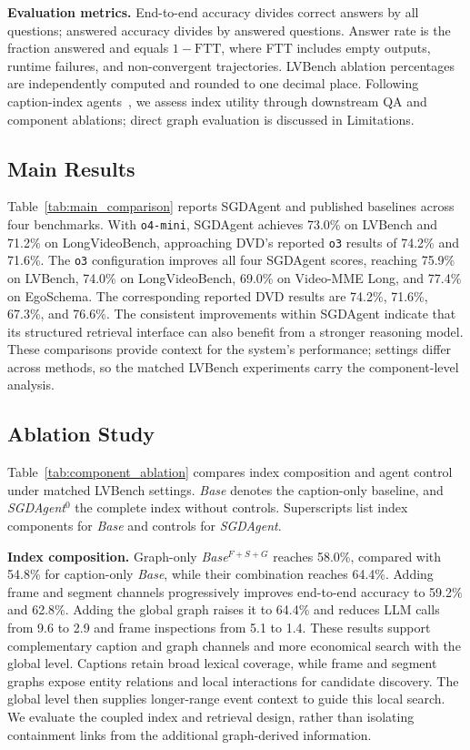 \documentclass[11pt]{article}
\begin{document}
\textbf{Evaluation metrics.}
End-to-end accuracy divides correct answers by all questions; answered accuracy divides by answered questions.
Answer rate is the fraction answered and equals $1-\mathrm{FTT}$, where FTT includes empty outputs, runtime failures, and non-convergent trajectories.
LVBench ablation percentages are independently computed and rounded to one decimal place.
Following caption-index agents~\cite{videoagent,deepvideo2025,drvideo2025}, we assess index utility through downstream QA and component ablations; direct graph evaluation is discussed in Limitations.

\subsection{Main Results}
\label{sec:results}

Table~\ref{tab:main_comparison} reports SGDAgent and published baselines across four benchmarks.
With \texttt{o4-mini}, SGDAgent achieves 73.0\% on LVBench and 71.2\% on LongVideoBench, approaching DVD's reported \texttt{o3} results of 74.2\% and 71.6\%.
The \texttt{o3} configuration improves all four SGDAgent scores, reaching 75.9\% on LVBench, 74.0\% on LongVideoBench, 69.0\% on Video-MME Long, and 77.4\% on EgoSchema.
The corresponding reported DVD results are 74.2\%, 71.6\%, 67.3\%, and 76.6\%.
The consistent improvements within SGDAgent indicate that its structured retrieval interface can also benefit from a stronger reasoning model.
These comparisons provide context for the system's performance; settings differ across methods, so the matched LVBench experiments carry the component-level analysis.

\subsection{Ablation Study}

Table~\ref{tab:component_ablation} compares index composition and agent control under matched LVBench settings.
\emph{Base} denotes the caption-only baseline, and \emph{SGDAgent}$^0$ the complete index without controls.
Superscripts list index components for \emph{Base} and controls for \emph{SGDAgent}.

\textbf{Index composition.}
Graph-only \emph{Base}$^{F+S+G}$ reaches 58.0\%, compared with 54.8\% for caption-only \emph{Base}, while their combination reaches 64.4\%.
Adding frame and segment channels progressively improves end-to-end accuracy to 59.2\% and 62.8\%.
Adding the global graph raises it to 64.4\% and reduces LLM calls from 9.6 to 2.9 and frame inspections from 5.1 to 1.4.
These results support complementary caption and graph channels and more economical search with the global level.
Captions retain broad lexical coverage, while frame and segment graphs expose entity relations and local interactions for candidate discovery.
The global level then supplies longer-range event context to guide this local search.
We evaluate the coupled index and retrieval design, rather than isolating containment links from the additional graph-derived information.
\end{document}
